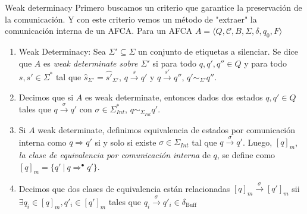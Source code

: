 \documentclass[10pt,xcolor={table,dvipsnames},t]{beamer}
\begin{document}
\begin{frame}{Weak determinacy}
Primero buscamos un criterio que garantice la preservación de la comunicación. Y con este criterio vemos un método de "extraer" la comunicación interna de un AFCA. Para un AFCA $A= \langle Q, \mathcal{C}, B, \Sigma, \delta, q_0, F \rangle$

\begin{enumerate}
    \item Weak Determinacy: Sea $\Sigma' \subseteq \Sigma$ un conjunto de etiquetas a silenciar. Se dice que $A$ es \emph{weak determinate sobre $\Sigma'$} si para todo $q, q', q'' \in Q$ y para todo $s, s' \in \Sigma^*$ tal que $\widehat{s}_{\Sigma'} = \widehat{s'}_{\Sigma'}$, $q \xrightarrow{s} q'$ y $q \xrightarrow{s'} q''$, $q' \sim_{\Sigma'} q''$.

    \item Decimos que si $A$ es weak determinate, entonces dados dos estados $q, q' \in Q$ tales que $q \xrightarrow{\sigma} q'$ con $\sigma \in \Sigma_{\mathit{Int}}^*$,  $q \sim_{\Sigma_\mathit{Int}} q'$.
    
    \item Si $A$ weak determinate, definimos equivalencia de estados por comunicación interna como $q \Rightarrow q'$ si y solo si existe $\sigma \in \Sigma_\mathit{Int}$ tal que $q \xrightarrow{\sigma} q'$. Luego, $[q]_m$, \emph{la clase de equivalencia por comunicación interna} de $q$, se define como $[q]_m = \{q'\ |\ q \Rightarrow^\bullet q'\}$. 
    
    \item Decimos que dos clases de equivalencia están relacionadas $[q]_m \xrightarrow{\sigma} [q']_m$ sii $\exists q_i \in [q]_m, q'_i \in [q']_m$ tales que $q_i \xrightarrow{\sigma} q'_i \in \delta_{\text{Buff}}$
\end{enumerate}
\end{frame}
\end{document}
